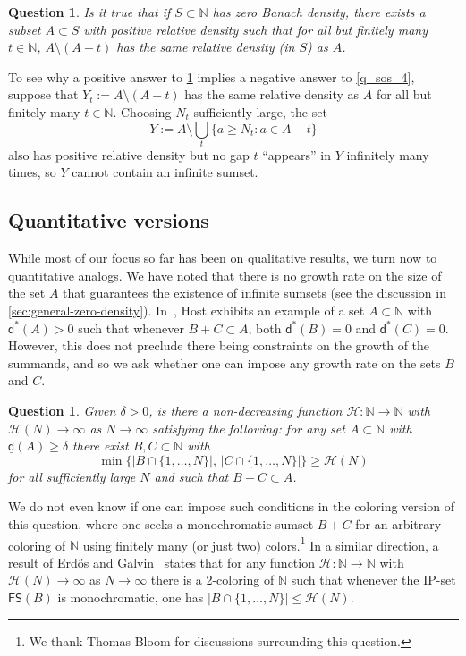 \documentclass[10pt,dvipsnames]{article}
\newtheorem{question}[theorem]{Question}
\theoremstyle{definition}
\theoremstyle{plain}
\newcommand{\N}{\mathbb{N}}
\newcommand{\ldens}{\underline{\mathsf{d}}}
\newcommand{\ubdens}{\mathsf{d}^*}
\newcommand{\Erdos}{Erd\H{o}s}
\newcommand{\FS}{\mathsf{FS}}
\begin{document}
\begin{question}\label{q_sos_3}
    Is it true that if $S\subset\N$ has zero  Banach density, there exists a subset $A\subset S$ with positive relative density such that for all but finitely many $t\in\N$,
    $A\setminus(A-t)$ has the same relative density (in $S$) as $A$.
\end{question}

To see why a positive answer to \cref{q_sos_3} implies a negative answer to \cref{q_sos_4}, suppose that $Y_t:=A\setminus(A-t)$ has the same relative density as $A$ for all but finitely many $t\in\N$. Choosing $N_t$ sufficiently large, the set 
\[
Y:=A\setminus\bigcup_t \{a\geq N_t: a\in A-t\}
\]
also has positive relative density but no gap $t$ ``appears'' in $Y$ infinitely many times, so $Y$ cannot contain an infinite sumset.

\subsection{Quantitative versions}
While most of our focus so far has been on qualitative results, we turn now to quantitative analogs.  
We have noted that there is no growth rate on the size of the set $A$ that guarantees the existence of infinite sumsets 
(see the discussion in \cref{sec:general-zero-density}). 
In~\cite{Host}, Host exhibits an example of a set $A\subset\N$ with $\ubdens(A)>0$ such that whenever $B+C\subset A$, both $\ubdens(B)=0$ and $\ubdens(C)=0$. 
However, this does not preclude there being constraints on the growth of the summands, and so we ask whether one can impose any growth rate on the sets $B$ and $C$. 
\begin{question}
\label{q_quant_growth_B+C_in_A}
Given $\delta>0$, is there a non-decreasing function $\mathcal{H}\colon\N\to\N$ with $\mathcal{H}(N)\to\infty$ as $N\to\infty$ satisfying the following: 
for any set $A\subset \N$ with $\ldens(A)\geq \delta$ there exist $B,C\subset\N$ with
\[
\min\bigl\{|B\cap \{1,\ldots,N\}|,\,|C\cap \{1,\ldots,N\}| \bigr\}\geq \mathcal{H}(N)
\]
for all sufficiently large $N$ and such that $B+C\subset A$.
\end{question}

We do not even know if one can impose such conditions in the coloring version of this question, where one seeks a monochromatic sumset $B+C$ for an arbitrary coloring of $\N$ using finitely many (or just two) colors.\footnote{We thank Thomas Bloom for discussions surrounding this question.}
In a similar direction, a result of \Erdos{} and Galvin~\cite{erdos_galvin}
states that for any function $\mathcal{H}\colon\N\to\N$ with $\mathcal{H}(N)\to\infty$ as $N\to\infty$ there is a 2-coloring of $\N$ such that whenever the IP-set $\FS(B)$ is monochromatic, one has $|B\cap\{1,\ldots,N\}|\leq\mathcal{H}(N)$.
\end{document}
